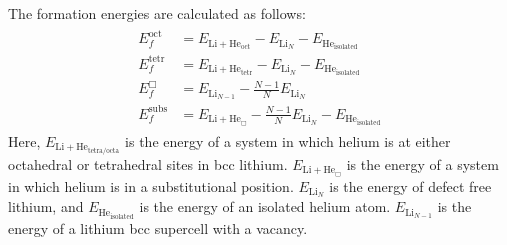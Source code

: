 The formation energies are calculated as follows:
\begin{align}\label{eq_forme}
\begin{split}
 E_{f}^{\text{oct}} & = E_{\text{Li}+\text{He}_{\text{oct}}} - E_{\text{Li}_N} - E_{\text{He}_{\text{isolated}}} \\
 E_{f}^{\text{tetr}}& = E_{\text{Li}+\text{He}_{\text{tetr}}} - E_{\text{Li}_N} - E_{\text{He}_{\text{isolated}}} \\
 E_f^{\Box} & = E_{\text{Li}_{N-1}} - \frac{N-1}{N} E_{\text{Li}_N} \\
 E_f^{\text{subs}} & = E_{\text{Li}+\text{He}_{\Box}} - \frac{N-1}{N} E_{\text{Li}_N} - E_{\text{He}_{\text{isolated}}}
\end{split}
 \end{align}
Here, $E_{\text{Li}+\text{He}_{\text{tetra/octa}}}$ is the energy of a system in which helium is at either octahedral or tetrahedral sites in bcc lithium. $E_{\text{Li}+\text{He}_{\Box}}$ is the energy of a system in which helium is in a substitutional position. $E_{\text{Li}_N}$ is the energy of defect free lithium, and $E_{\text{He}_{\text{isolated}}}$ is the energy of an isolated helium atom. $E_{\text{Li}_{N-1}}$ is the energy of a lithium bcc supercell with a vacancy.


